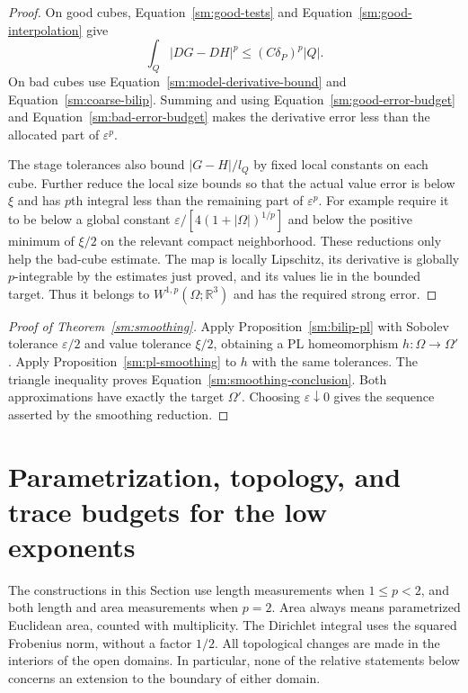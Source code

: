 \documentclass[11pt]{article}
\numberwithin{equation}{section}
\theoremstyle{definition}
\theoremstyle{remark}
\begin{document}
\begin{proof}
On good cubes, Equation~\eqref{sm:good-tests} and
Equation~\eqref{sm:good-interpolation} give
\[
 \int_Q|DG-DH|^p\le(C\delta_P)^p|Q|.
\]
On bad cubes use
Equation~\eqref{sm:model-derivative-bound} and
Equation~\eqref{sm:coarse-bilip}.  Summing and
using Equation~\eqref{sm:good-error-budget} and
Equation~\eqref{sm:bad-error-budget} makes the
derivative error less than the allocated
part of $\varepsilon^p$.

The stage tolerances also bound
$|G-H|/l_Q$ by fixed local constants
on each cube.  Further reduce the
local size bounds so that the actual
value error is below $\xi$ and has
$p$th integral less than the remaining
part of $\varepsilon^p$.  For example require
it to be below a global constant
$\varepsilon/[4(1+|\Omega|)^{1/p}]$ and below
the positive minimum of $\xi/2$ on
the relevant compact neighborhood.
These reductions only help the bad-cube
estimate.  The map is locally Lipschitz,
its derivative is globally $p$-integrable
by the estimates just proved, and its
values lie in the bounded target.
Thus it belongs to $W^{1,p}(\Omega;\mathbb R^3)$
and has the required strong error.
\end{proof}

\begin{proof}[Proof of Theorem~\ref{sm:smoothing}]
Apply Proposition~\ref{sm:bilip-pl} with
Sobolev tolerance $\varepsilon/2$ and value
tolerance $\xi/2$, obtaining a PL
homeomorphism $h:\Omega\to\Omega'$.
Apply Proposition~\ref{sm:pl-smoothing}
to $h$ with the same tolerances.
The triangle inequality proves
Equation~\eqref{sm:smoothing-conclusion}.
Both approximations have exactly the
target $\Omega'$.  Choosing
$\varepsilon\downarrow0$ gives the sequence
asserted by the smoothing reduction.
\end{proof}

\section{Parametrization, topology, and trace budgets for the low exponents}
\label{lt:section}\label{sec:low-tools}

The constructions in this Section use length measurements when
$1\leq p<2$, and both length and area measurements when $p=2$.
Area always means parametrized Euclidean area, counted with multiplicity.
The Dirichlet integral uses the squared Frobenius norm, without a factor
$1/2$.  All topological changes are made in the interiors of the open
domains.  In particular, none of the relative statements below concerns
an extension to the boundary of either domain.
\end{document}
